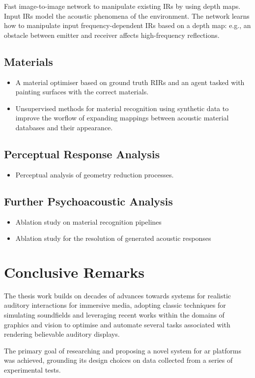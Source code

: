 Fast image-to-image network to manipulate existing IRs by using depth maps. Input IRs model the acoustic phenomena of the environment. The network learns how to manipulate input frequency-dependent IRs based on a depth map: e.g., an obstacle between emitter and receiver affects high-frequency reflections.

\subsection{Materials}
\begin{itemize}
    \item A material optimiser based on ground truth RIRs and an agent tasked with painting surfaces with the correct materials.
    \item Unsupervised methods for material recognition using synthetic data to improve the worflow of expanding mappings between acoustic material databases and their appearance.
\end{itemize}

\subsection{Perceptual Response Analysis}

\begin{itemize}
    \item Perceptual analysis of geometry reduction processes.
\end{itemize}

\subsection{Further Psychoacoustic Analysis}


\begin{itemize}
    \item Ablation study on material recognition pipelines
    \item Ablation study for the resolution of generated acoustic responses
\end{itemize}

\section{Conclusive Remarks}
The thesis work builds on decades of advances towards systems for realistic auditory interactions for immersive media, adopting classic techniques for simulating soundfields and leveraging recent works within the domains of graphics and vision to optimise and automate several tasks associated with rendering believable auditory displays.\par
The primary goal of researching and proposing a novel system for \acrshort{ar} platforms was achieved, grounding its design choices on data collected from a series of experimental tests.